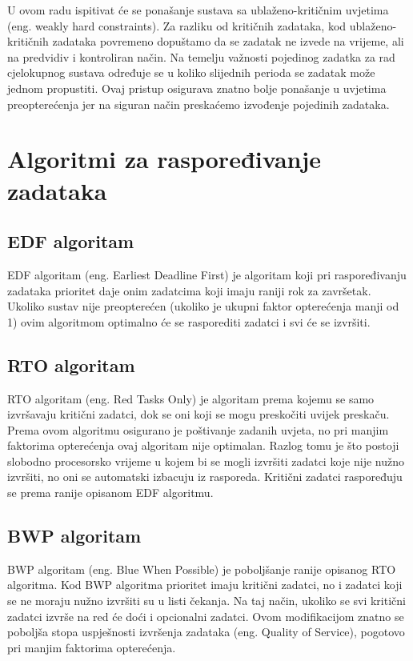 \documentclass[../zavrsni.tex]{subfiles}
\begin{document}

U ovom radu ispitivat će se ponašanje sustava sa ublaženo-kritičnim uvjetima (eng. weakly hard constraints). Za razliku od 
kritičnih zadataka, kod ublaženo-kritičnih zadataka povremeno dopuštamo da se zadatak ne izvede na vrijeme, ali na predvidiv i 
kontroliran način. Na temelju važnosti pojedinog zadatka za rad cjelokupnog sustava određuje se u koliko slijednih perioda 
se zadatak može jednom propustiti. Ovaj pristup osigurava znatno bolje ponašanje u uvjetima preopterećenja jer na siguran 
način preskaćemo izvođenje pojedinih zadataka.

\section{Algoritmi za raspoređivanje zadataka}

\subsection{EDF algoritam}

EDF algoritam (eng. Earliest Deadline First) je algoritam koji pri raspoređivanju zadataka prioritet daje onim zadatcima 
koji imaju raniji rok za završetak. Ukoliko sustav nije preopterećen (ukoliko je ukupni faktor opterećenja manji od 1) 
ovim algoritmom optimalno će se rasporediti zadatci i svi će se izvršiti.

\subsection{RTO algoritam}

RTO algoritam (eng. Red Tasks Only) je algoritam prema kojemu se samo izvršavaju kritični zadatci, 
dok se oni koji se mogu preskočiti uvijek preskaču. Prema ovom algoritmu osigurano je poštivanje zadanih uvjeta, no pri manjim 
faktorima opterećenja ovaj algoritam 
nije optimalan. Razlog tomu je što postoji slobodno procesorsko vrijeme u kojem bi se mogli izvršiti zadatci koje nije nužno izvršiti, no 
oni se automatski izbacuju iz rasporeda. Kritični zadatci raspoređuju se prema ranije opisanom EDF algoritmu. 

\subsection{BWP algoritam}

BWP algoritam (eng. Blue When Possible) je poboljšanje ranije opisanog RTO algoritma. Kod BWP algoritma prioritet imaju kritični zadatci, 
no i zadatci koji se ne moraju nužno izvršiti su u listi čekanja. Na taj način, ukoliko se svi kritični zadatci izvrše na red će doći
i opcionalni zadatci. Ovom modifikacijom znatno se poboljša stopa uspješnosti izvršenja zadataka (eng. Quality of Service), pogotovo pri
 manjim faktorima opterećenja.
\end{document}
